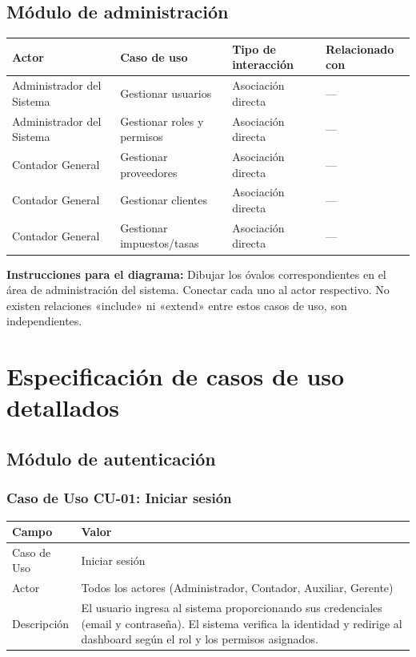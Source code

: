 \documentclass[stu]{apa7}
\begin{document}
\subsection{Módulo de administración}

\begin{longtable}{|L{3cm}|L{5cm}|L{4cm}|L{3cm}|}
\hline
{}
\textbf{Actor} & \textbf{Caso de uso} & \textbf{Tipo de interacción} & \textbf{Relacionado con} \\
\hline
\endhead
Administrador del Sistema & Gestionar usuarios & Asociación directa & --- \\
\hline
Administrador del Sistema & Gestionar roles y permisos & Asociación directa & --- \\
\hline
Contador General & Gestionar proveedores & Asociación directa & --- \\
\hline
Contador General & Gestionar clientes & Asociación directa & --- \\
\hline
Contador General & Gestionar impuestos/tasas & Asociación directa & --- \\
\hline
\end{longtable}

\textbf{Instrucciones para el diagrama:}
Dibujar los óvalos correspondientes en el área de administración del sistema. Conectar cada uno al actor respectivo. No existen relaciones «include» ni «extend» entre estos casos de uso, son independientes.

\newpage

\section{Especificación de casos de uso detallados}

\subsection{Módulo de autenticación}

\subsubsection{Caso de Uso CU-01: Iniciar sesión}

\begin{tabularx}{\textwidth}{|l|X|}
\hline
\rowcolor[gray]{0.9}
\textbf{Campo} & \textbf{Valor} \\
\hline
Caso de Uso & Iniciar sesión \\
\hline
Actor & Todos los actores (Administrador, Contador, Auxiliar, Gerente) \\
\hline
Descripción & El usuario ingresa al sistema proporcionando sus credenciales (email y contraseña). El sistema verifica la identidad y redirige al dashboard según el rol y los permisos asignados. \\
\hline
\end{tabularx}
\end{document}
